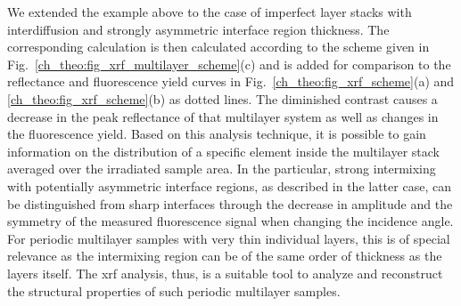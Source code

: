 We extended the example above to the case of imperfect layer stacks with interdiffusion and strongly asymmetric interface region thickness. The corresponding calculation is then calculated according to the scheme given in Fig.~\ref{ch_theo:fig_xrf_multilayer_scheme}(c) and is added for comparison to the reflectance and fluorescence yield curves in Fig.~\ref{ch_theo:fig_xrf_scheme}(a) and \ref{ch_theo:fig_xrf_scheme}(b) as dotted lines. The diminished contrast causes a decrease in the peak reflectance of that multilayer system as well as changes in the fluorescence yield. Based on this analysis technique, it is possible to gain information on the distribution of a specific element inside the multilayer stack averaged over the irradiated sample area. In the particular, strong intermixing with potentially asymmetric interface regions, as described in the latter case, can be distinguished from sharp interfaces through the decrease in amplitude and the symmetry of the measured fluorescence signal when changing the incidence angle. For periodic multilayer samples with very thin individual layers, this is of special relevance as the intermixing region can be of the same order of thickness as the layers itself. The \gls{xrf} analysis, thus, is a suitable tool to analyze and reconstruct the structural properties of such periodic multilayer samples.



